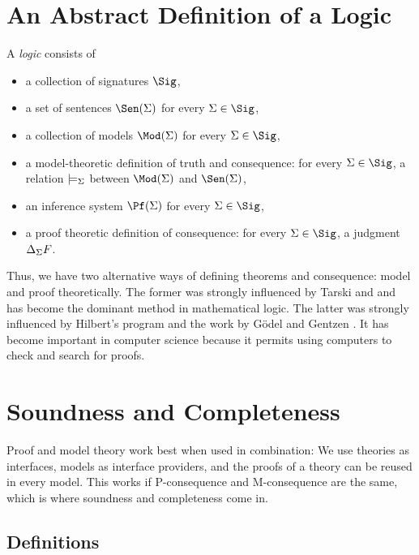 \section{An Abstract Definition of a Logic}

\begin{definition}[Logic]\label{def:logic:abs}
A \emph{logic} consists of
\begin{itemize}
	\item a collection of signatures $\Sig$,
	\item a set of sentences $\Sen(\Sigma)$ for every $\Sigma\in\Sig$,
	\item a collection of models $\Mod(\Sigma)$ for every $\Sigma\in\Sig$,
	\item	a model-theoretic definition of truth and consequence: for every $\Sigma\in\Sig$, a relation $\models_\Sigma$ between $\Mod(\Sigma)$ and $\Sen(\Sigma)$,
	\item an inference system $\Pf(\Sigma)$ for every $\Sigma\in\Sig$,
	\item a proof theoretic definition of consequence: for every $\Sigma\in\Sig$, a judgment $\Delta_\Sigma F$.
\end{itemize}
\end{definition}

Thus, we have two alternative ways of defining theorems and consequence: model and proof theoretically.
The former was strongly influenced by Tarski \cite{tarskilogic} and \cite{robinsonmodeltheory} and has become the dominant method in mathematical logic.
The latter was strongly influenced by Hilbert's program \cite{hilbertsprogram} and the work by G\"odel \cite{goedelcompleteness} and Gentzen \cite{gentzen}.
It has become important in computer science because it permits using computers to check and search for proofs.

\section{Soundness and Completeness}

Proof and model theory work best when used in combination: We use theories as interfaces, models as interface providers, and the proofs of a theory can be reused in every model.
This works if P-consequence and M-consequence are the same, which is where soundness and completeness come in.

\subsection{Definitions}

